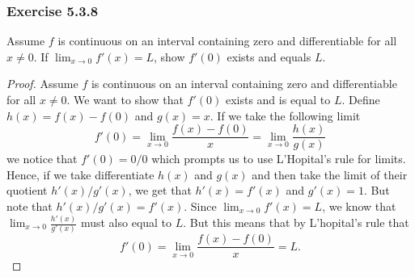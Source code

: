 

\subsubsection{Exercise 5.3.8} Assume \( f  \) is continuous on an interval containing zero and differentiable for all \( x \neq 0  \). If \( \lim_{ x \to 0  } f'(x) = L \), show \( f'(0)  \) exists and equals \( L  \).

\begin{proof}
Assume \( f  \) is continuous on an interval containing zero and differentiable for all \( x \neq 0  \). We want to show that \( f'(0)  \) exists and is equal to \( L  \). Define \( h(x) = f(x) - f(0)  \) and \( g(x) = x  \). If we take the following limit 
\[f'(0) =  \lim_{ x \to 0 } \frac{ f(x) - f(0)  }{ x  } = \lim_{ x \to 0  } \frac{ h(x)  }{ g(x)  }   \]
we notice that \( f'(0) = 0 / 0 \) which prompts us to use L'Hopital's rule for limits. Hence, if we take differentiate \( h(x)  \) and \( g(x) \) and then take the limit of their quotient \( h'(x) / g'(x)  \), we get that \( h'(x) = f'(x)  \) and \( g'(x) = 1  \). But note that \( h'(x) / g'(x) = f'(x)  \). Since \( \lim_{ x \to 0 } f'(x) = L  \), we know that \( \lim_{ x \to 0 } \frac{ h'(x)  }{ g'(x)  }  \) must also equal to \( L  \). But this means that by L'hopital's rule that 
\[ f'(0) =  \lim_{ x \to 0 }  \frac{ f(x) - f(0) }{ x  } = L. \]
\end{proof}







